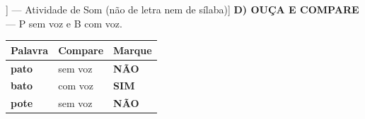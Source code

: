 \begin{exercicio}[Som /p/ [[p]] --- Atividade de Som (não de letra nem de sílaba)]
\textbf{D) OUÇA E COMPARE} --- P sem voz e B com voz.

\begin{center}
\begin{tabular}{@{}p{4.2cm}p{6.2cm}p{1.6cm}@{}}
\hline
\textbf{Palavra} & \textbf{Compare} & \textbf{Marque} \\
\hline
\textbf{pato} & sem voz & \textbf{NÃO} \\
\textbf{bato} & com voz & \textbf{SIM} \\
\textbf{pote} & sem voz & \textbf{NÃO} \\
\hline
\end{tabular}
\end{center}

\end{exercicio}

